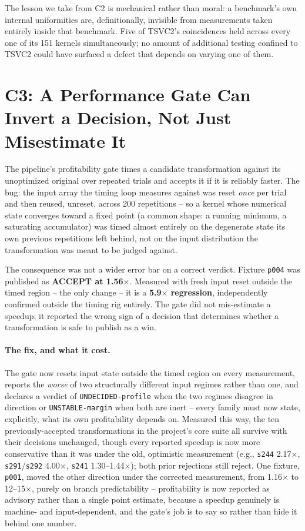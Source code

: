 \documentclass[sigconf,review,anonymous]{acmart}
\begin{document}
The lesson we take from C2 is mechanical rather than moral: a benchmark's
own internal uniformities are, definitionally, invisible from measurements
taken entirely inside that benchmark. Five of TSVC2's coincidences held
across every one of its 151 kernels simultaneously; no amount of additional
testing confined to TSVC2 could have surfaced a defect that depends on
varying one of them.

\section{C3: A Performance Gate Can Invert a Decision, Not Just Misestimate It}
\label{sec:c3}

The pipeline's profitability gate times a candidate transformation against
its unoptimized original over repeated trials and accepts it if it is
reliably faster. The bug: the input array the timing loop measures against
was reset \emph{once} per trial and then reused, unreset, across 200
repetitions -- so a kernel whose numerical state converges toward a fixed
point (a common shape: a running minimum, a saturating accumulator) was
timed almost entirely on the degenerate state its own previous repetitions
left behind, not on the input distribution the transformation was meant to
be judged against.

The consequence was not a wider error bar on a correct verdict. Fixture
\texttt{p004} was published as \textbf{ACCEPT at 1.56$\times$}. Measured with
fresh input reset outside the timed region -- the only change -- it is a
\textbf{5.9$\times$ regression}, independently confirmed outside the timing
rig entirely. The gate did not mis-estimate a speedup; it reported the wrong
sign of a decision that determines whether a transformation is safe to
publish as a win.

\paragraph{The fix, and what it cost.} The gate now resets input state
outside the timed region on every measurement, reports the \emph{worse} of
two structurally different input regimes rather than one, and declares a
verdict of \texttt{UNDECIDED-profile} when the two regimes disagree in
direction or \texttt{UNSTABLE-margin} when both are inert -- every family
must now state, explicitly, what its own profitability depends on. Measured
this way, the ten previously-accepted transformations in the project's core
suite all survive with their decisions unchanged, though every reported
speedup is now more conservative than it was under the old, optimistic
measurement (e.g., \texttt{s244} 2.17$\times$, \texttt{s291}/\texttt{s292}
4.00$\times$, \texttt{s241} 1.30--1.44$\times$); both prior rejections still
reject. One fixture, \texttt{p001}, moved the other direction under the
corrected measurement, from 1.16$\times$ to 12--15$\times$, purely on branch
predictability -- profitability is now reported as advisory rather than a
single point estimate, because a speedup genuinely is machine- and
input-dependent, and the gate's job is to say so rather than hide it behind
one number.
\end{document}
